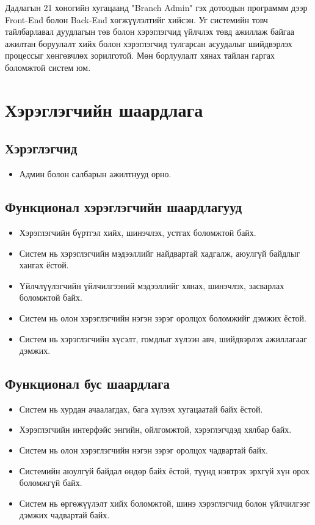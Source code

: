 Дадлагын 21 хоногийн хугацаанд "Branch Admin" гэх дотоодын программм дээр Front-End болон Back-End хөгжүүлэлтийг хийсэн. Уг системийн товч тайлбарлавал дуудлагын төв болон хэрэглэгчид үйлчлэх төвд ажиллаж байгаа ажилтан боруулалт хийх болон хэрэглэгчид тулгарсан асуудалыг шийдвэрлэх процессыг хөнгөвчлөх зорилготой. Мөн борлуулалт хянах тайлан гаргах боломжтой систем юм.
\section{Хэрэглэгчийн шаардлага}

  \subsection{Хэрэглэгчид}
    \begin{itemize}
        \item Админ болон салбарын ажилтнууд орно.
    \end{itemize}

  \subsection{Функционал хэрэглэгчийн шаардлагууд}
    \begin{itemize}
        \item Хэрэглэгчийн бүртгэл хийх, шинэчлэх, устгах боломжтой байх.
        \item Систем нь хэрэглэгчийн мэдээллийг найдвартай хадгалж, аюулгүй байдлыг хангах ёстой.
        \item Үйлчлүүлэгчийн үйлчилгээний мэдээллийг хянах, шинэчлэх, засварлах боломжтой байх.
        \item Систем нь олон хэрэглэгчийн нэгэн зэрэг оролцох боломжийг дэмжих ёстой.
        \item Систем нь хэрэглэгчийн хүсэлт, гомдлыг хүлээн авч, шийдвэрлэх ажиллагааг дэмжих.
    \end{itemize}

  \subsection{Функционал бус шаардлага}
    \begin{itemize}
        \item Систем нь хурдан ачаалагдах, бага хүлээх хугацаатай байх ёстой.
        \item Хэрэглэгчийн интерфэйс энгийн, ойлгомжтой, хэрэглэгчдэд хялбар байх.
        \item Систем нь олон хэрэглэгчийн нэгэн зэрэг оролцох чадвартай байх.
        \item Системийн аюулгүй байдал өндөр байх ёстой, түүнд нэвтрэх эрхгүй хүн орох боломжгүй байх.
        \item Систем нь өргөжүүлэлт хийх боломжтой, шинэ хэрэглэгчид болон үйлчилгээг дэмжих чадвартай байх.
    \end{itemize}

